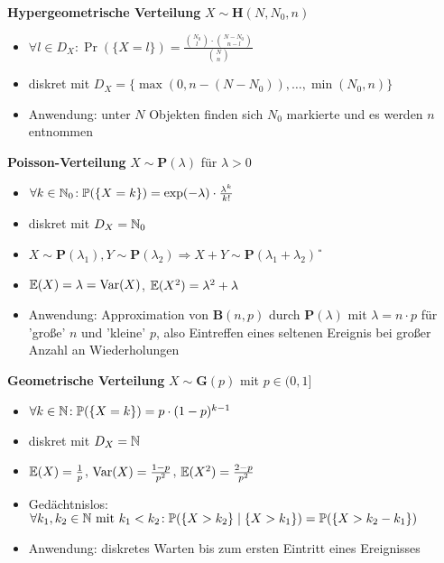 \textbf{Hypergeometrische Verteilung} $X\sim\mathbf{H}(N,N_0,n)$
\begin{itemize}
\item $\forall l \in D_X\!: \Pr(\{X=l\})
  =\frac{\binom{N_0}{l} \cdot \binom{N-N_0}{n-l}}{\binom{N}{n}}$

\item diskret mit
  $D_X = \{\max(0,n-(N-N_0)),\ldots,\min(N_0,n)\}$

\item Anwendung: unter $N$ Objekten finden sich $N_0$ markierte und es werden
  $n$ entnommen
\end{itemize}

\textbf{Poisson-Verteilung} $X\sim\mathbf{P}(\lambda)$ für $\lambda > 0$
\begin{itemize}
\item $\forall k\in\mathbb{N}_0\!:
  \mathbb{P}(\{X=k\}) = \exp(-\lambda) \cdot \frac{\lambda^k}{k!}$

\item diskret mit $D_X = \mathbb{N}_0$

\item $X\sim\mathbf{P}(\lambda_1), Y\sim\mathbf{P}(\lambda_2)
  \Rightarrow X+Y\sim\mathbf{P}(\lambda_1 + \lambda_2)$ \U

\item $\mathbb{E}(X) = \lambda = \operatorname{Var}(X)$, $\mathbb{E}(X^2) = \lambda^2 + \lambda$

\item Anwendung: Approximation von $\mathbf{B}(n,p)$ durch $\mathbf{P}(\lambda)$
  mit $\lambda = n \cdot p$ für 'große' $n$ und 'kleine' $p$, also Eintreffen
  eines seltenen Ereignis bei großer Anzahl an Wiederholungen
\end{itemize}

\newpage
\textbf{Geometrische Verteilung} $X\sim\mathbf{G}(p)$ mit $p \in (0,1]$
\begin{itemize}
\item $\forall k\in\mathbb{N}\!: \mathbb{P}(\{X=k\}) = p \cdot (1-p)^{k-1}$

\item diskret mit $D_X = \mathbb{N}$

\item $\mathbb{E}(X) = \frac{1}{p}$, $\operatorname{Var}(X) = \frac{1-p}{p^2}$,
  $\mathbb{E}(X^2) = \frac{2-p}{p^2}$

\item Gedächtnislos:\\ $\forall k_1,k_2\in\mathbb{N} \text{ mit } k_1 < k_2\!:
  \mathbb{P}(\{X > k_2\} \mid \{X > k_1\}) = \mathbb{P}(\{X > k_2 - k_1\})$

\item Anwendung: diskretes Warten bis zum ersten Eintritt eines Ereignisses
\end{itemize}

